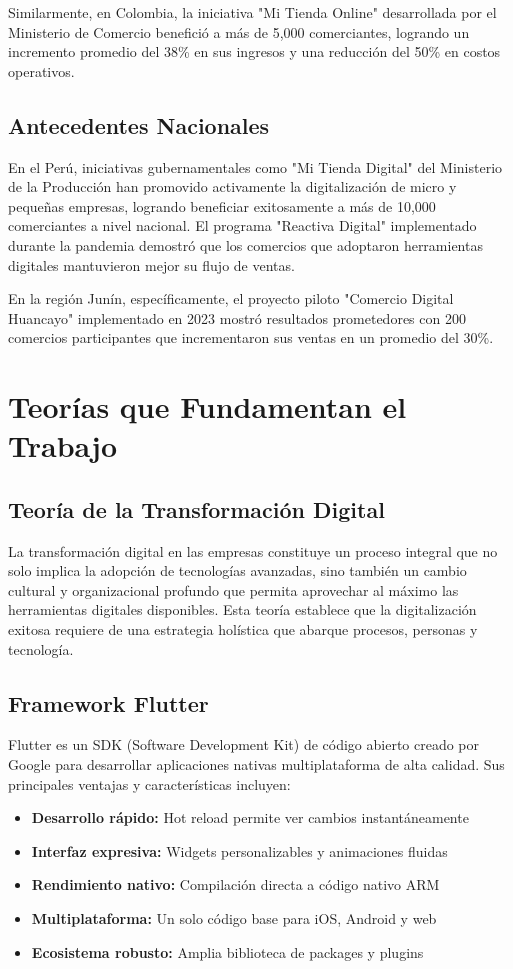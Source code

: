 \documentclass[12pt,a4paper]{report}
\begin{document}
Similarmente, en Colombia, la iniciativa "Mi Tienda Online" desarrollada por el Ministerio de Comercio benefició a más de 5,000 comerciantes, logrando un incremento promedio del 38\% en sus ingresos y una reducción del 50\% en costos operativos.

\subsection{Antecedentes Nacionales}
En el Perú, iniciativas gubernamentales como "Mi Tienda Digital" del Ministerio de la Producción han promovido activamente la digitalización de micro y pequeñas empresas, logrando beneficiar exitosamente a más de 10,000 comerciantes a nivel nacional. El programa "Reactiva Digital" implementado durante la pandemia demostró que los comercios que adoptaron herramientas digitales mantuvieron mejor su flujo de ventas.

En la región Junín, específicamente, el proyecto piloto "Comercio Digital Huancayo" implementado en 2023 mostró resultados prometedores con 200 comercios participantes que incrementaron sus ventas en un promedio del 30\%.

\section{Teorías que Fundamentan el Trabajo}

\subsection{Teoría de la Transformación Digital}
La transformación digital en las empresas constituye un proceso integral que no solo implica la adopción de tecnologías avanzadas, sino también un cambio cultural y organizacional profundo que permita aprovechar al máximo las herramientas digitales disponibles. Esta teoría establece que la digitalización exitosa requiere de una estrategia holística que abarque procesos, personas y tecnología.

\subsection{Framework Flutter}
Flutter es un SDK (Software Development Kit) de código abierto creado por Google para desarrollar aplicaciones nativas multiplataforma de alta calidad. Sus principales ventajas y características incluyen:

\begin{itemize}
	\item \textbf{Desarrollo rápido:} Hot reload permite ver cambios instantáneamente
	\item \textbf{Interfaz expresiva:} Widgets personalizables y animaciones fluidas
	\item \textbf{Rendimiento nativo:} Compilación directa a código nativo ARM
	\item \textbf{Multiplataforma:} Un solo código base para iOS, Android y web
	\item \textbf{Ecosistema robusto:} Amplia biblioteca de packages y plugins
\end{itemize}
\end{document}
